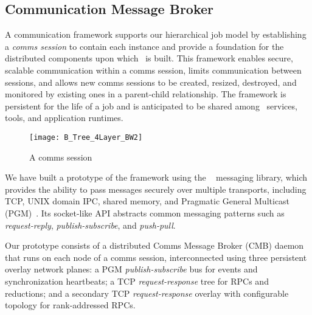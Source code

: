 \subsection{Communication Message Broker}

A communication framework supports our hierarchical job model
by establishing a {\em comms session} to contain each \flux instance
and provide a foundation for the distributed components upon which
\flux\ is built.
This framework enables secure, scalable communication
within a comms session, limits communication between sessions,
and allows new comms sessions to be created, resized, destroyed,
and monitored by existing ones in a parent-child relationship.
The framework is persistent for the life of a job and is anticipated to be
shared among \flux\ services, tools, and application runtimes.

\begin{figure}
\centering
\texttt{[image: B\_Tree\_4Layer\_BW2]}
\vspace{.8cm}
\caption{A comms session} 
\vspace{-.5cm}
\label{fig:commswireup}
\end{figure}

We have built a prototype of the framework using the \zMQ~\cite{ZMQGuide}
messaging library, which provides the ability to pass messages securely
over multiple transports, including TCP, UNIX domain IPC, shared memory, and
Pragmatic General Multicast (PGM)~\cite{rfc3208}.
Its socket-like API abstracts common messaging patterns such as
{\em request-reply}, {\em publish-subscribe},
and {\em push-pull}.

Our prototype consists of a distributed Comms Message Broker (CMB)
daemon that runs on each node of a comms session, interconnected using
three persistent overlay network planes:
a PGM {\em publish-subscribe} bus for events and synchronization heartbeats;
a TCP {\em request-response} tree for RPCs and reductions; and
a secondary TCP {\em request-response} overlay with configurable topology
for rank-addressed RPCs.


